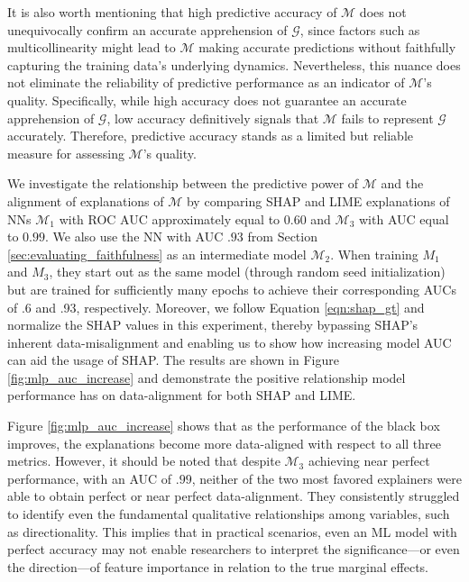 \documentclass[12pt]{article}  %
\newcommand{\mM}{\mathcal{M}}
\begin{document}
           It is also worth mentioning that high predictive accuracy of $\mathcal{M}$ does not unequivocally confirm an accurate apprehension of $\mathcal{G}$, since factors such as multicollinearity might lead to $\mathcal{M}$ making accurate predictions without faithfully capturing the training data's underlying dynamics. Nevertheless, this nuance does not eliminate the reliability of predictive performance as an indicator of $\mathcal{M}$'s quality. Specifically, while high accuracy does not guarantee an accurate apprehension of $\mathcal{G}$, low accuracy definitively signals that $\mathcal{M}$ fails to represent $\mathcal{G}$ accurately. Therefore, predictive accuracy stands as a limited but reliable measure for assessing $\mathcal{M}$'s quality.
 
            
            We investigate the relationship between the predictive power of $\mathcal{M}$ and the alignment of explanations of $\mM$ by comparing SHAP and LIME explanations of NNs $\mathcal{M}_1$  with ROC AUC approximately equal to $0.60$ and $\mathcal{M}_3$ with AUC equal to $0.99$. We also use the NN with AUC $.93$ from Section \ref{sec:evaluating_faithfulness} as an intermediate model $\mathcal{M}_2$. When training $M_1$ and $M_3$, they start out as the same model (through random seed initialization) but are trained for sufficiently many epochs to achieve their corresponding AUCs of .6 and .93, respectively. Moreover, we follow Equation \ref{eqn:shap_gt} and normalize the SHAP values in this experiment, thereby bypassing SHAP's inherent data-misalignment and enabling us to show how increasing model AUC can aid the usage of SHAP. The results are shown in Figure \ref{fig:mlp_auc_increase} and demonstrate the positive relationship model performance has on data-alignment for both SHAP and LIME.
            
     Figure \ref{fig:mlp_auc_increase} shows that as the performance of the black box improves, the explanations become more data-aligned with respect to all three metrics. However, it should be noted that despite $\mathcal{M}_3$ achieving near perfect performance, with an AUC of $.99$, neither of the two most favored explainers were able to obtain perfect or near perfect data-alignment. They consistently struggled to identify even the fundamental qualitative relationships among variables, such as directionality. This implies that in practical scenarios, even an ML model with perfect accuracy may not enable researchers to interpret the significance—or even the direction—of feature importance in relation to the true marginal effects.  
     
\end{document}
